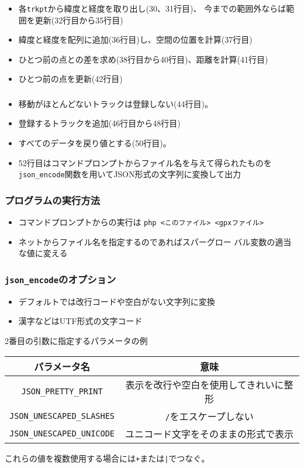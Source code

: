 \begin{frame}[containsverbatim]
 \frametitle{}
\end{frame}
\begin{frame}[containsverbatim]
 \frametitle{}
 \begin{itemize}
  \item 各\texttt{trkpt}から緯度と経度を取り出し(30、31行目)、
  今までの範囲外ならば範囲を更新(32行目から35行目)
  \item 緯度と経度を配列に追加(36行目)し、空間の位置を計算(37行目)
  \item ひとつ前の点との差を求め(38行目から40行目)、距離を計算(41行目)
  \item ひとつ前の点を更新(42行目)
 \end{itemize}
\end{frame}
\begin{frame}[containsverbatim]
 \frametitle{}
  \begin{itemize}
  \item 移動がほとんどないトラックは登録しない(44行目)。
  \item 登録するトラックを追加(46行目から48行目)
  \item すべてのデータを戻り値とする(50行目)。
	\item 52行目はコマンドプロンプトからファイル名を与えて得られたものを
				\Verb+json_encode+関数を用いてJSON形式の文字列に変換して出力
  \end{itemize}
\end{frame}
\begin{frame}[containsverbatim]
 \frametitle{プログラムの実行方法}
 \begin{itemize}
  \item コマンドプロンプトからの実行は
        \texttt{php <このファイル> <gpxファイル>}
  \item ネットからファイル名を指定するのであればスパーグロー
 バル変数の適当な値に変える
 \end{itemize}
\end{frame}
\begin{frame}[containsverbatim]
 \frametitle{\texttt{json\_encode}のオプション}
 \begin{itemize}
  \item デフォルトでは改行コードや空白がない文字列に変換
  \item 漢字などはUTF形式の文字コード
 \end{itemize}
 2番目の引数に指定するパラメータの例

 \begin{tabular}{|c|c|}
 \hline
 パラメータ名& 意味\\\hline
 \Verb+JSON_PRETTY_PRINT+& 表示を改行や空白を使用してきれいに整形
		 \\ \hline
 \Verb+JSON_UNESCAPED_SLASHES+& \texttt{/}をエスケープしない\\ \hline
 \Verb+JSON_UNESCAPED_UNICODE+& ユニコード文字をそのままの形式で表示\\ \hline
\end{tabular}
 これらの値を複数使用する場合には\texttt{+}または\texttt{|}でつなぐ。
\end{frame}

